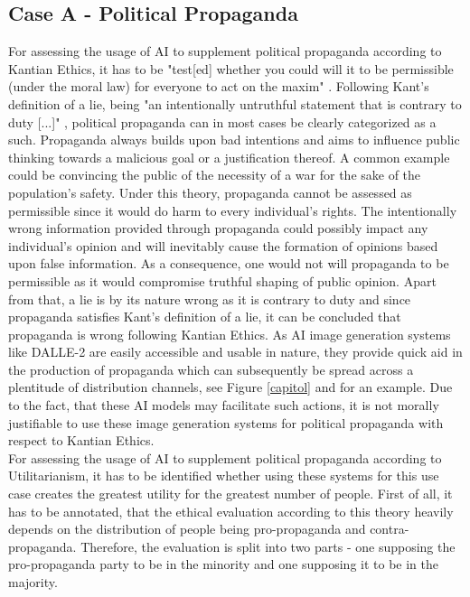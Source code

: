 \documentclass[10pt,twocolumn,twoside]{osajnl}
\begin{document}
\subsection{Case A - Political Propaganda}
For assessing the usage of AI to supplement political propaganda according to Kantian Ethics, it has to be "test[ed] whether you could will it to be permissible (under the moral law) for everyone to act on the maxim" \cite{kant}.
Following Kant's definition of a lie, being "an intentionally untruthful statement that is contrary to duty [...]" \cite{kant}, political propaganda can in most cases be clearly categorized as a such.
Propaganda always builds upon bad intentions and aims to influence public thinking towards a malicious goal or a justification thereof. A common example could be convincing the public
of the necessity of a war for the sake of the population's safety. Under this theory, propaganda cannot be assessed as permissible since it would do harm to every individual's rights.
The intentionally wrong information provided through propaganda could possibly impact any individual's opinion and will inevitably cause the formation of opinions based 
upon false information. As a consequence, one would not will propaganda to be permissible as it would compromise truthful shaping of public opinion. 
Apart from that, a lie is by its nature wrong as it is contrary to duty \cite{kant} and %
since propaganda satisfies Kant's definition of a lie, it can be concluded that propaganda is wrong following Kantian Ethics. 
As AI image generation systems like DALLE-2 are easily accessible and usable in nature, they provide quick aid in the production of propaganda which can subsequently be spread across a plentitude
of distribution channels, see Figure \ref{capitol} and \cite{trump} for an example. Due to the fact, that these AI models may facilitate such actions, it is not morally justifiable to use these image generation systems for
political propaganda with respect to Kantian Ethics.
\\ %
For assessing the usage of AI to supplement political propaganda according to Utilitarianism, it has to be identified whether using these systems for this use case creates the greatest utility
for the greatest number of people. First of all, it has to be annotated, that the ethical evaluation according to this theory heavily depends on the distribution of people being pro-propaganda and 
contra-propaganda. Therefore, the evaluation is split into two parts - one supposing the pro-propaganda party to be in the minority and one supposing it to be in the majority.
\end{document}
